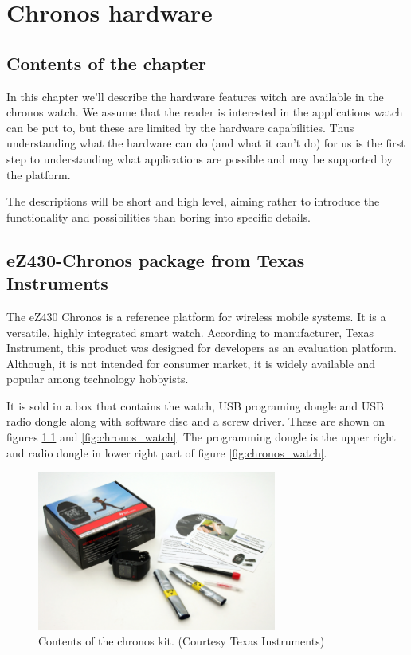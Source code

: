 \chapter{Chronos hardware}

\section{Contents of the chapter}

In this chapter we'll describe the hardware features witch are
available in the chronos watch. We assume that the reader is
interested in the applications watch can be put to, but these are
limited by the hardware capabilities. Thus understanding what the
hardware can do (and what it can't do) for us is the first step to
understanding what applications are possible and may be supported by
the platform.

The descriptions will be short and high level, aiming rather to
introduce the functionality and possibilities than boring into specific
details.

\section{eZ430-Chronos package from Texas Instruments}

The eZ430 Chronos is a reference platform for wireless mobile systems.
It is a versatile, highly integrated smart watch.  According to
manufacturer, Texas Instrument, this product was designed for
developers as an evaluation platform.  Although, it is not intended
for consumer market, it is widely available and popular among
technology hobbyists.

It is sold in a box that contains the watch, USB programing dongle and
USB radio dongle along with software disc and a screw driver. These
are shown on figures \ref{fig:chronos_kit} and \ref{fig:chronos_watch}.
The programming dongle is the upper right and radio dongle in
lower right part of figure \ref{fig:chronos_watch}.

\begin{figure}[h]
  \centering
  \includegraphics[width=0.7\textwidth]{img/chronos_kit.jpg}
  \caption{Contents of the chronos kit. (Courtesy Texas Instruments)}
  \label{fig:chronos_kit}
\end{figure}

